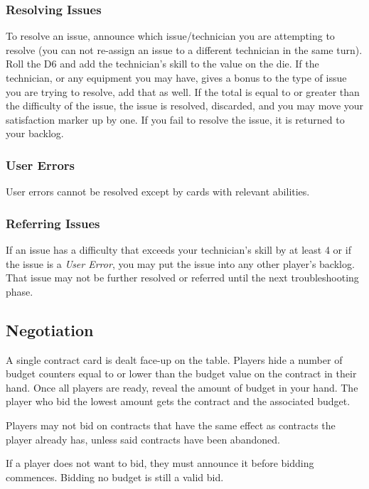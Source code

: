\documentclass[twocolumn]{article}
\begin{document}
\subsubsection*{Resolving Issues}

To resolve an issue, announce which issue/technician you are attempting to resolve (you can not re-assign an issue to a different technician in the same turn). Roll the D6 and add the technician's skill to the value on the die. If the technician, or any equipment you may have, gives a bonus to the type of issue you are trying to resolve, add that as well. If the total is equal to or greater than the difficulty of the issue, the issue is resolved, discarded, and you may move your satisfaction marker up by one.
If you fail to resolve the issue, it is returned to your backlog.

\subsubsection*{User Errors}

User errors cannot be resolved except by cards with relevant abilities.

\subsubsection*{Referring Issues}

If an issue has a difficulty that exceeds your technician's skill by at least 4 or if the issue is a \emph{User Error}, you may put the issue into any other player's backlog. That issue may not be further resolved or referred until the next troubleshooting phase.


\subsection*{Negotiation}

A single contract card is dealt face-up on the table. Players hide a number of budget counters equal to or lower than the budget value on the contract in their hand. Once all players are ready, reveal the amount of budget in your hand. The player who bid the lowest amount gets the contract and the associated budget.

Players may not bid on contracts that have the same effect as contracts the player already has, unless said contracts have been abandoned.

If a player does not want to bid, they must announce it before bidding commences. Bidding no budget is still a valid bid.
\end{document}
